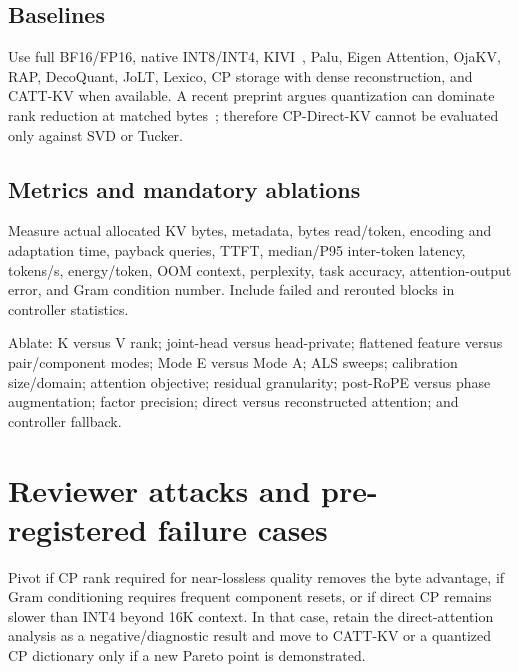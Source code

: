 \documentclass[11pt]{article}
\begin{document}
\subsection{Baselines}
Use full BF16/FP16, native INT8/INT4, KIVI~\cite{kivi}, Palu, Eigen Attention, OjaKV, RAP,
DecoQuant, JoLT, Lexico, CP storage with dense reconstruction, and CATT-KV when available. A recent
preprint argues quantization can dominate rank reduction at matched bytes~\cite{quantdom}; therefore
CP-Direct-KV cannot be evaluated only against SVD or Tucker.

\subsection{Metrics and mandatory ablations}
Measure actual allocated KV bytes, metadata, bytes read/token, encoding and adaptation time,
payback queries, TTFT, median/P95 inter-token latency, tokens/s, energy/token, OOM context,
perplexity, task accuracy, attention-output error, and Gram condition number. Include failed and rerouted
blocks in controller statistics.

Ablate: K versus V rank; joint-head versus head-private; flattened feature versus pair/component
modes; Mode E versus Mode A; ALS sweeps; calibration size/domain; attention objective; residual
granularity; post-RoPE versus phase augmentation; factor precision; direct versus reconstructed
attention; and controller fallback.

\section{Reviewer attacks and pre-registered failure cases}

\begin{riskbox}
Pivot if CP rank required for near-lossless quality removes the byte advantage, if Gram conditioning
requires frequent component resets, or if direct CP remains slower than INT4 beyond 16K context.
In that case, retain the direct-attention analysis as a negative/diagnostic result and move to
CATT-KV or a quantized CP dictionary only if a new Pareto point is demonstrated.
\end{riskbox}
\end{document}
